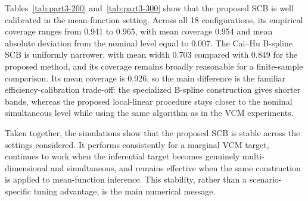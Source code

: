 \begin{table}[t!]
\caption{Part 3: mean function SCB, comparing the proposed band with the
Cai--Hu (2025) B-spline band for \(n=300\).}
\label{tab:part3-300}\par
{}
\end{table}

Tables~\ref{tab:part3-200} and~\ref{tab:part3-300} show that the proposed
SCB is well calibrated in the mean-function setting. Across all 18
configurations, its empirical coverage ranges from 0.941 to 0.965, with mean
coverage 0.954 and mean absolute deviation from the nominal level equal to
0.007. The Cai--Hu B-spline SCB is uniformly narrower, with mean width 0.703
compared with 0.849 for the proposed method, and its coverage remains broadly
reasonable for a finite-sample comparison. Its mean coverage is 0.926, so the
main difference is the familiar efficiency-calibration trade-off: the
specialized B-spline construction gives shorter bands, whereas the proposed
local-linear procedure stays closer to the nominal simultaneous level while
using the same algorithm as in the VCM experiments.

Taken together, the simulations show that the proposed SCB is stable across
the settings considered. It performs consistently for a marginal VCM target,
continues to work when the inferential target becomes genuinely
multi-dimensional and simultaneous, and remains effective when the same
construction is applied to mean-function inference. This stability, rather
than a scenario-specific tuning advantage, is the main numerical message.


